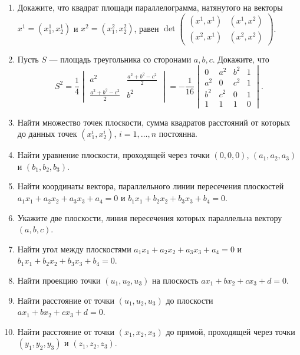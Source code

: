 \begin{enumerate}
		\item Докажите, что квадрат площади параллелограмма, натянутого на векторы $x^1 = (x^1_1, x^1_2)$ и $x^2 = (x^2_1, x^2_2)$, равен $\det
			\begin{pmatrix}
				(x^1, x^1) & (x^1, x^2) \\
				(x^2, x^1) & (x^2, x^2)
			\end{pmatrix}$.

		\item Пусть $S$ — площадь треугольника со сторонами $a, b, c$. Докажите, что
		\[ 
			S^2 = \frac{1}{4} \begin{vmatrix}
				a^2 & \frac{a^2+b^2-c^2}{2} \\
				\frac{a^2+b^2-c^2}{2} & b^2 
			\end{vmatrix} = -\frac{1}{16} \begin{vmatrix}
				0 & a^2 & b^2 & 1 \\
				a^2 & 0 & c^2 & 1 \\
				b^2 & c^2 & 0 & 1 \\
				1 & 1 & 1 & 0
			\end{vmatrix}.
		\]

		\item Найти множество точек плоскости, сумма квадратов расстояний от которых до данных точек $(x^i_1, x^i_2)$, $i=1,\dots,n$ постоянна.

		\item Найти уравнение плоскости, проходящей через точки $(0,0,0)$, $(a_1, a_2, a_3)$ и $(b_1, b_2, b_3)$.

		\item Найти координаты вектора, параллельного линии пересечения плоскостей $a_1x_1 + a_2x_2 + a_3x_3 + a_4 = 0$ и $b_1x_1 + b_2x_2 + b_3x_3 + b_4 = 0$.

		\item Укажите две плоскости, линия пересечения которых параллельна вектору $(a,b,c)$.

		\item Найти угол между плоскостями $a_1x_1 + a_2x_2 + a_3x_3 + a_4 = 0$ и $b_1x_1 + b_2x_2 + b_3x_3 + b_4 = 0$.

		\item Найти проекцию точки $(u_1, u_2, u_3)$ на плоскость $ax_1 + bx_2 + cx_3 + d = 0$.

		\item Найти расстояние от точки $(u_1, u_2, u_3)$ до плоскости $ax_1 + bx_2 + cx_3 + d = 0$.

		\item Найти расстояние от точки $(x_1, x_2, x_3)$ до прямой, проходящей через точки $(y_1, y_2, y_3)$ и $(z_1, z_2, z_3)$.


\end{enumerate}
